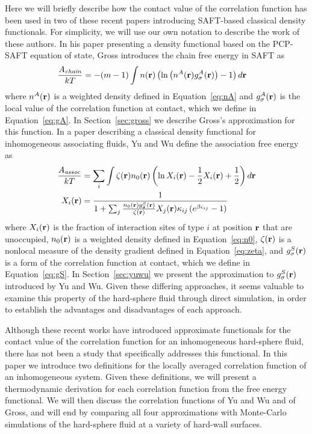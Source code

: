 Here we will briefly describe how the contact value of the correlation
function has been used in two of these recent papers introducing SAFT-based
classical density functionals.  For simplicity, we
will use our own notation to describe the work of these authors.  In
his paper presenting a density functional based on the PCP-SAFT
equation of state\cite{gross2009density}, Gross introduces the chain
free energy in SAFT as
\begin{align}
  \frac{A_\textit{chain}}{kT} &= -(m-1) \int n(\textbf{r}) \left(\ln\left(n^A(\textbf{r})
  g_\sigma^A(\textbf{r}) \right)-1\right) d\textbf{r} \label{eq:Achain}
\end{align}
where $n^A(\textbf{r})$ is a weighted density defined in Equation~\ref{eq:nA}
and $g_\sigma^A(\textbf{r})$ is the local value of the correlation function at
contact, which we define in Equation~\ref{eq:gA}.  In
Section~\ref{sec:gross} we describe Gross's approximation for this
function. In a paper describing a classical
density functional for inhomogeneous associating
fluids\cite{yu2002fmt-dft-inhomogeneous-associating}, Yu and Wu define
the association free energy as
\begin{align}
  \frac{A_\textit{assoc}}{kT} &= \sum_i \int \zeta(\textbf{r})n_0(\textbf{r}) \left(\ln X_i(\textbf{r}) - \frac12
  X_i(\textbf{r}) + \frac12\right) d\textbf{r} \label{eq:Aassoc} \\
  X_i(\textbf{r}) &= \frac{1}{1 + \sum_j \frac{n_0(\textbf{r}) g_\sigma^{S}(\textbf{r})}{\zeta(\textbf{r})}
                                 X_j(\textbf{r})\kappa_{ij} \left(e^{\beta
                                   \epsilon_{ij}}-1\right)}
  \label{eq:X}
\end{align}
where $X_i(\textbf{r})$ is the fraction of interaction sites of type $i$ at
position $\textbf{r}$ that are unoccupied, $n_0(\textbf{r})$ is a weighted density
defined in Equation~\ref{eq:n0}, $\zeta(\textbf{r})$ is a nonlocal measure of
the density gradient defined in Equation~\ref{eq:zeta}, and
$g_\sigma^S(\textbf{r})$ is a form of the correlation
function at contact, which we define in Equation~\ref{eq:gS}.  In
Section~\ref{sec:yuwu} we present the approximation to
$g_\sigma^S(\textbf{r})$ introduced by Yu and Wu.
Given these differing approaches, it seems valuable to examine this
property of the hard-sphere fluid through direct simulation, in order
to establish the advantages and disadvantages of each approach.

Although these recent works have introduced approximate functionals
for the contact value of the correlation function for an inhomogeneous
hard-sphere fluid\cite{yu2002fmt-dft-inhomogeneous-associating,
  gross2009density}, there has not been a study that specifically
addresses this functional.
%
In this paper we introduce two definitions for the locally averaged
correlation function of an inhomogeneous system.
%
%
Given these definitions, we will present a thermodynamic derivation
for each correlation function from the free energy functional.  We
will then discuss the correlation functions of Yu and Wu and of Gross, and
will end by comparing all four approximations with Monte-Carlo
simulations of the hard-sphere fluid at a variety of hard-wall
surfaces.


